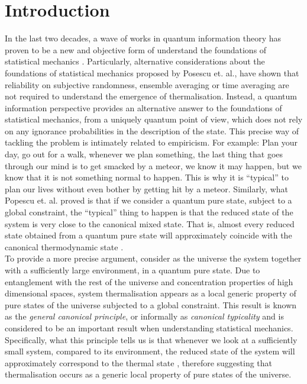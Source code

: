 
\chapter*{Introduction}

In the last two decades, a wave of works in quantum information theory has proven to be a new and objective form of understand the foundations of statistical mechanics \cite{popescu_foundations_2005, goldstein_canonical_2006, gemmer_thermalization_2006, popescu_entanglement_2006, goldstein_approach_2010, kaufman_quantum_2016, gogolin_equilibration_2016 }. Particularly, alternative considerations about the foundations of statistical mechanics proposed by Posescu et. al.\cite{popescu_foundations_2005},  have shown that reliability on subjective randomness\cite{ma_statistical_1985}, ensemble averaging\cite{farquhar_ergodic_1965} or time averaging\cite{jancel_foundations_2013} are not required to understand the emergence of thermalisation. Instead, a quantum information perspective\cite{horodecki_partial_2005} provides an alternative answer to the foundations of statistical mechanics, from a uniquely quantum point of view, which does not rely on any ignorance probabilities in the description of the state. This precise way of tackling the problem is intimately related to empiricism. For example: Plan your day, go out for a walk, whenever we plan something, the last thing that goes through our mind is to get smacked by a meteor, we know it may happen, but we know that it is not something normal to happen. This is why it is  ``typical'' to plan our lives without even bother by getting hit by a meteor. Similarly, what Popescu et. al. proved is that if we consider a quantum pure state, subject to a global constraint, the ``typical'' thing to happen is that the reduced state of the system is very close to the canonical mixed state. That is, almost every reduced state obtained from a quantum pure state will approximately coincide with the canonical thermodynamic state \cite{deutsch_thermodynamic_2010, singh_foundations_2013}.\\
\indent To provide a more precise argument, consider as the universe the system together with a sufficiently large environment, in a quantum pure state. Due to entanglement with the rest of the universe and concentration properties of high dimensional spaces, system thermalisation appears as a local generic property of pure states of the universe subjected to a global constraint. This result is known as the \textit{general canonical principle}, or informally as \textit{canonical typicality} and is considered to be an important result when understanding statistical mechanics. Specifically, what this principle tells us is that whenever we look at a sufficiently small system, compared to its environment, the reduced state of the system will approximately correspond to the thermal state \cite{popescu_foundations_2005, popescu_entanglement_2006, goldstein_canonical_2006, gemmer_quantum_2004},  therefore suggesting that thermalisation occurs as a generic local property of pure states of the universe.\\
